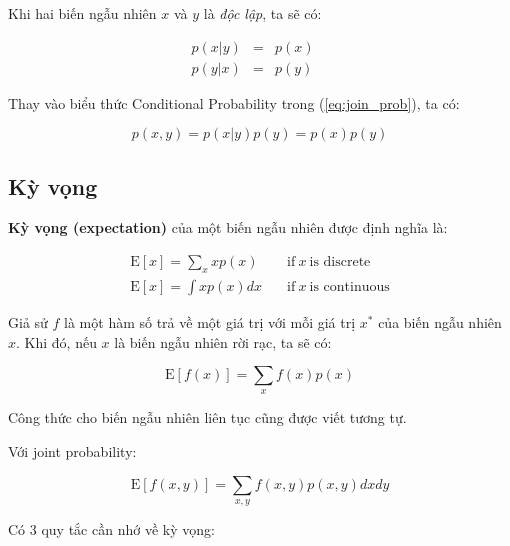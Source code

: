 \documentclass[../main-report.tex]{subfiles}
\begin{document}
Khi hai biến ngẫu nhiên \(x\) và \(y\) là \emph{độc lập}, ta sẽ có:


\begin{eqnarray}
  p(x | y) &=& p(x) \quad \\
  p(y | x) &=& p(y)
\end{eqnarray}


Thay vào biểu thức Conditional Probability trong (\ref{eq:join_prob}), ta có:

\begin{equation}
	p(x, y) = p(x | y) p(y) = p(x) p(y)
\end{equation}


\subsection{Kỳ vọng}
\textbf{Kỳ vọng (expectation)} của một biến ngẫu nhiên được định nghĩa là:


\begin{eqnarray}
  \text{E}[x] = \sum_x x p(x) \quad & \text{if}~ x ~ \text{is discrete} \quad \\
  \text{E}[x] = \int x p(x) dx \quad & \text{if}~ x ~ \text{is continuous}
\end{eqnarray}

Giả sử \(f\) là một hàm số trả về một giá trị với mỗi giá trị \(x^*\) của biến ngẫu nhiên \(x\). Khi đó, nếu \(x\) là biến ngẫu nhiên rời rạc, ta sẽ có:

\begin{equation}
	\text{E}[f(x)] = \sum_x f(x) p(x)
\end{equation}

Công thức cho biến ngẫu nhiên liên tục cũng được viết tương tự.

Với joint probability:

\begin{equation}
\text{E}[f(x, y)] = \sum_{x,y} f(x, y) p(x, y) dx dy
\end{equation}

Có 3 quy tắc cần nhớ về kỳ vọng:
\end{document}
